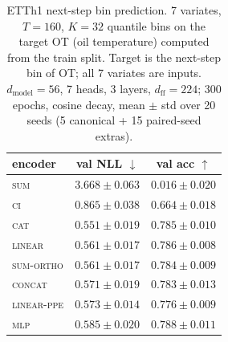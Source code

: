 \begin{table}[t]
\centering
\caption{ETTh1 next-step bin prediction. 7 variates, $T{=}160$, $K{=}32$
quantile bins on the target OT (oil temperature) computed from the train
split. Target is the next-step bin of OT; all 7 variates are inputs.
$d_{\text{model}}{=}56$, 7 heads, 3 layers, $d_{\text{ff}}{=}224$; 300
epochs, cosine decay, mean $\pm$ std over 20 seeds (5 canonical + 15
paired-seed extras).}
\label{tab:etth1}
\begin{tabular}{lcc}
\toprule
encoder & val NLL $\downarrow$ & val acc $\uparrow$ \\
\midrule
\textsc{sum}        & $3.668 \pm 0.063$  & $0.016 \pm 0.020$ \\
\textsc{ci}         & $0.865 \pm 0.038$  & $0.664 \pm 0.018$ \\
\midrule
\textsc{cat}        & $0.551 \pm 0.019$  & $0.785 \pm 0.010$ \\
\textsc{linear}     & $0.561 \pm 0.017$  & $0.786 \pm 0.008$ \\
\textsc{sum-ortho}  & $0.561 \pm 0.017$  & $0.784 \pm 0.009$ \\
\textsc{concat}     & $0.571 \pm 0.019$  & $0.783 \pm 0.013$ \\
\textsc{linear-ppe} & $0.573 \pm 0.014$  & $0.776 \pm 0.009$ \\
\textsc{mlp}        & $0.585 \pm 0.020$  & $0.788 \pm 0.011$ \\
\bottomrule
\end{tabular}
\end{table}
